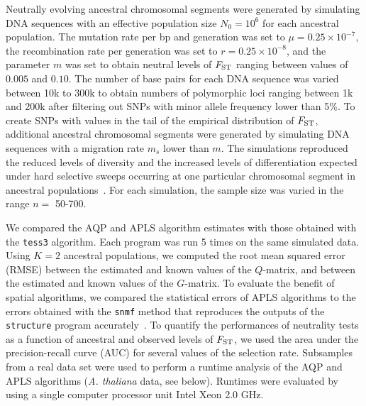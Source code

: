 Neutrally evolving ancestral chromosomal segments were generated by simulating
DNA sequences with an effective population size $N_0 = 10^6$ for each ancestral
population. The mutation rate per bp and generation was set to $\mu = 0.25
\times 10^{-7}$, the recombination rate per generation was set to $r = 0.25
\times 10^{-8}$, and the parameter $m$ was set to obtain neutral levels of
$F_{\rm ST}$ ranging between values of $0.005$ and $0.10$. The number of base
pairs for each DNA sequence was varied between 10k to 300k to obtain numbers of
polymorphic loci ranging between 1k and 200k after filtering out SNPs with
minor allele frequency lower than 5$\%$. To create SNPs with values in the tail
of the empirical distribution of $F_{\rm ST}$, additional ancestral chromosomal
segments were generated by simulating DNA sequences with a migration rate $m_s$
lower than $m$. The simulations reproduced the reduced levels of diversity and
the increased levels of differentiation expected under hard selective sweeps
occurring at one particular chromosomal segment in ancestral
populations~\citep{Martins2016}. For each simulation, the sample size was varied
in the range $n =$ 50-700.

We compared the AQP and APLS algorithm estimates with those obtained with the
{\tt tess3} algorithm. Each program was run 5 times on the same simulated data.
Using $K = 2$ ancestral populations, we computed the root mean squared error
(RMSE) between the estimated and known values of the $Q$-matrix, and between the
estimated and known values of the $G$-matrix. To evaluate the benefit of spatial
algorithms, we compared the statistical errors of APLS algorithms to the errors
obtained with the {\tt snmf} method that reproduces the outputs of the {\tt
  structure} program accurately~\citep{Frichot2014,Frichot2015}. To quantify the
performances of neutrality tests as a function of ancestral and observed levels
of $F_{\rm ST}$, we used the area under the precision-recall curve (AUC) for
several values of the selection rate. Subsamples from a real data set were used
to perform a runtime analysis of the AQP and APLS algorithms ({\it A. thaliana}
data, see below). Runtimes were evaluated by using a single computer processor
unit Intel Xeon 2.0 GHz.

